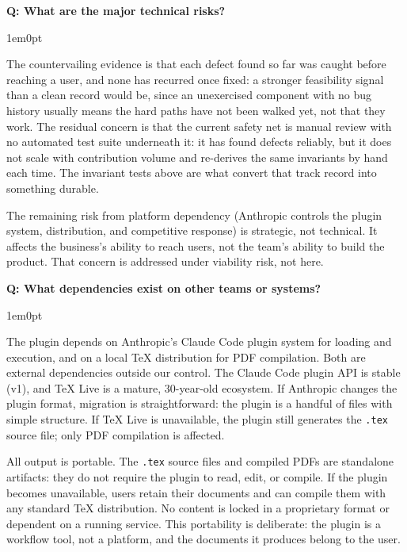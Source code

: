 \documentclass[11pt,letterpaper]{article}
\newcounter{faqnum}
\newenvironment{faqpair}[1]{%
  \needspace{4\baselineskip}%
  \vspace{0.5em}%
  \refstepcounter{faqnum}%
  \noindent\textbf{\color{SectionBlue}Q\thefaqnum: #1}\par\nopagebreak[4]%
  \vspace{0.2em}%
  \begin{adjustwidth}{1em}{0pt}%
  \setlength{\parindent}{0pt}%
}{%
  \end{adjustwidth}%
  \vspace{0.5em}%
}
\begin{document}
\begin{faqpair}{What are the major technical risks?}
  The countervailing evidence is that each defect found so far was caught before reaching a user, and none has recurred once fixed: a stronger feasibility signal than a clean record would be, since an unexercised component with no bug history usually means the hard paths have not been walked yet, not that they work. The residual concern is that the current safety net is manual review with no automated test suite underneath it: it has found defects reliably, but it does not scale with contribution volume and re-derives the same invariants by hand each time. The invariant tests above are what convert that track record into something durable.

  The remaining risk from platform dependency (Anthropic controls the plugin system, distribution, and competitive response) is strategic, not technical. It affects the business's ability to reach users, not the team's ability to build the product. That concern is addressed under viability risk, not here.
\end{faqpair}

\begin{faqpair}{What dependencies exist on other teams or systems?}
  The plugin depends on Anthropic's Claude Code plugin system for loading and execution, and on a local TeX distribution for PDF compilation. Both are external dependencies outside our control. The Claude Code plugin API is stable (v1), and TeX Live is a mature, 30-year-old ecosystem. If Anthropic changes the plugin format, migration is straightforward: the plugin is a handful of files with simple structure. If TeX Live is unavailable, the plugin still generates the \texttt{.tex} source file; only PDF compilation is affected.

  All output is portable. The \texttt{.tex} source files and compiled PDFs are standalone artifacts: they do not require the plugin to read, edit, or compile. If the plugin becomes unavailable, users retain their documents and can compile them with any standard TeX distribution. No content is locked in a proprietary format or dependent on a running service. This portability is deliberate: the plugin is a workflow tool, not a platform, and the documents it produces belong to the user.
\end{faqpair}
\end{document}
